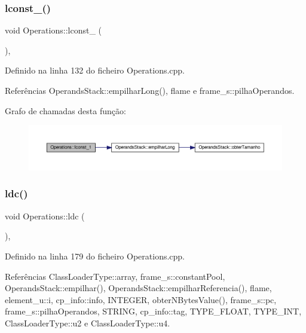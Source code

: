 \subsubsection{\texorpdfstring{lconst\+\_()}{lconst\_1()}}
{\footnotesize\ttfamily void Operations\+::lconst\+\_ (\begin{DoxyParamCaption}{ }\end{DoxyParamCaption})\hspace{0.3cm}{\ttfamily [static]}, {\ttfamily [private]}}



Definido na linha 132 do ficheiro Operations.\+cpp.



Referências Operands\+Stack\+::empilhar\+Long(), flame e frame\+\_\+s\+::pilha\+Operandos.

Grafo de chamadas desta função\+:
\nopagebreak
\begin{figure}[H]
\begin{center}
\leavevmode
\includegraphics[width=350pt]{classOperations_ae6c6a8e3d75dec712e534434f85909ce_cgraph}
\end{center}
\end{figure}
\mbox{\label{classOperations_aa9a87c1ef4605d0b7b7a99c8d9bc693c}} 
\subsubsection{\texorpdfstring{ldc()}{ldc()}}
{\footnotesize\ttfamily void Operations\+::ldc (\begin{DoxyParamCaption}{ }\end{DoxyParamCaption})\hspace{0.3cm}{\ttfamily [static]}, {\ttfamily [private]}}



Definido na linha 179 do ficheiro Operations.\+cpp.



Referências Class\+Loader\+Type\+::array, frame\+\_\+s\+::constant\+Pool, Operands\+Stack\+::empilhar(), Operands\+Stack\+::empilhar\+Referencia(), flame, element\+\_\+u\+::i, cp\+\_\+info\+::info, I\+N\+T\+E\+G\+ER, obter\+N\+Bytes\+Value(), frame\+\_\+s\+::pc, frame\+\_\+s\+::pilha\+Operandos, S\+T\+R\+I\+NG, cp\+\_\+info\+::tag, T\+Y\+P\+E\+\_\+\+F\+L\+O\+AT, T\+Y\+P\+E\+\_\+\+I\+NT, Class\+Loader\+Type\+::u2 e Class\+Loader\+Type\+::u4.

